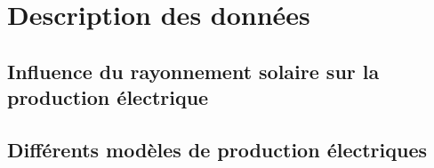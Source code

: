 
\chapter{Description des données}


\section{Influence du rayonnement solaire sur la production électrique}



\section{Différents modèles de production électriques}


\section{}


